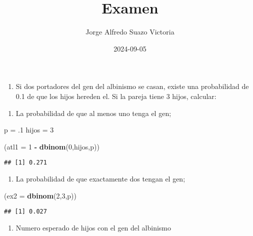 \documentclass[
]{article}
\title{Examen}
\author{Jorge Alfredo Suazo Victoria}
\date{2024-09-05}
\newenvironment{Shaded}{\begin{snugshade}}{\end{snugshade}}
\newcommand{\AttributeTok}[1]{\textcolor[rgb]{0.13,0.29,0.53}{#1}}
\newcommand{\DecValTok}[1]{\textcolor[rgb]{0.00,0.00,0.81}{#1}}
\newcommand{\FunctionTok}[1]{\textcolor[rgb]{0.13,0.29,0.53}{\textbf{#1}}}
\newcommand{\NormalTok}[1]{#1}
\newcommand{\OtherTok}[1]{\textcolor[rgb]{0.56,0.35,0.01}{#1}}
\newcommand{\SpecialCharTok}[1]{\textcolor[rgb]{0.81,0.36,0.00}{\textbf{#1}}}
\providecommand{\tightlist}{%
  \setlength{\itemsep}{0pt}\setlength{\parskip}{0pt}}
\begin{document}
\maketitle

\begin{enumerate}
\def\labelenumi{\arabic{enumi}.}
\tightlist
\item
  Si dos portadores del gen del albinismo se casan, existe una
  probabilidad de 0.1 de que los hijos hereden el. Si la pareja tiene 3
  hijos, calcular:
\end{enumerate}

\begin{enumerate}
\def\labelenumi{\alph{enumi})}
\tightlist
\item
  La probabilidad de que al menos uno tenga el gen;
\end{enumerate}

\begin{Shaded}
\begin{Highlighting}[]
\NormalTok{p }\OtherTok{=}\NormalTok{ .}\DecValTok{1}
\NormalTok{hijos }\OtherTok{=} \DecValTok{3}

\NormalTok{(}\AttributeTok{atl1 =} \DecValTok{1} \SpecialCharTok{{-}} \FunctionTok{dbinom}\NormalTok{(}\DecValTok{0}\NormalTok{,hijos,p))}
\end{Highlighting}
\end{Shaded}

\begin{verbatim}
## [1] 0.271
\end{verbatim}

\begin{enumerate}
\def\labelenumi{\alph{enumi})}
\setcounter{enumi}{1}
\tightlist
\item
  La probabilidad de que exactamente dos tengan el gen;
\end{enumerate}

\begin{Shaded}
\begin{Highlighting}[]
\NormalTok{(}\AttributeTok{ex2 =} \FunctionTok{dbinom}\NormalTok{(}\DecValTok{2}\NormalTok{,}\DecValTok{3}\NormalTok{,p))}
\end{Highlighting}
\end{Shaded}

\begin{verbatim}
## [1] 0.027
\end{verbatim}

\begin{enumerate}
\def\labelenumi{\alph{enumi})}
\setcounter{enumi}{2}
\tightlist
\item
  Numero esperado de hijos con el gen del albinismo
\end{enumerate}
\end{document}
